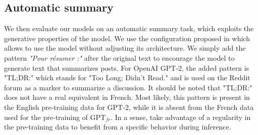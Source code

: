 \begin{table}[!ht]
\footnotesize
{}
\caption{Perplexity of our models. We do not update the models on the training set and the perplexity is directly measured on the test set which are identical for two benchmarks. The n-gram model is trained on the corresponding training corpora.}
\end{table}


\subsection{Automatic summary} 

We then evaluate our models on an automatic summary task, which exploits the generative properties of the model. We use the configuration proposed in \cite{radford_2018} which allows to use the model without adjusting its architecture. We simply add the pattern \textit{"Pour résumer :"} after the original text to encourage the model to generate text that summarizes posts. For OpenAI GPT-2, the added pattern is "TL;DR:" which stands for "Too Long; Didn't Read." and is used on the Reddit forum as a marker to summarize a discussion. It should be noted that "TL;DR:" does not have a real equivalent in French. Most likely, this pattern is present in the English pre-training data for GPT-2, while it is absent from the French data used for the pre-training of $\text{GPT}_{fr}$. In a sense, \cite{radford_2018} take advantage of a regularity in the pre-training data to benefit from a specific behavior during inference.

